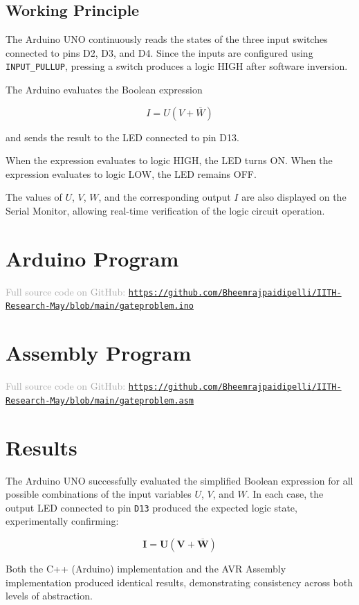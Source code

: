 \documentclass[12pt,a4paper]{article}
\begin{document}
\subsection{Working Principle}

The Arduino UNO continuously reads the states of the three input switches connected to pins D2, D3, and D4. Since the inputs are configured using \texttt{INPUT\_PULLUP}, pressing a switch produces a logic HIGH after software inversion.

The Arduino evaluates the Boolean expression

\[
I = U(V + \overline{W})
\]

and sends the result to the LED connected to pin D13.

When the expression evaluates to logic HIGH, the LED turns ON. When the expression evaluates to logic LOW, the LED remains OFF.

The values of $U$, $V$, $W$, and the corresponding output $I$ are also displayed on the Serial Monitor, allowing real-time verification of the logic circuit operation.

\section{{Arduino Program}}
\begin{center}
  \small\textcolor{DarkGray}{Full source code on GitHub:\enspace}
  \href{https://github.com/Bheemrajpaidipelli/IITH-Research-May/blob/main/gateproblem.ino}%
       {\textcolor{AccentTeal}{\texttt{https://github.com/Bheemrajpaidipelli/IITH-Research-May/blob/main/gateproblem.ino}}}
\end{center}
\section{Assembly Program}
\begin{center}
  \small\textcolor{DarkGray}{Full source code on GitHub:\enspace}
  \href{https://github.com/Bheemrajpaidipelli/IITH-Research-May/blob/main/gateproblem.asm}%
       {\textcolor{AccentTeal}{\texttt{https://github.com/Bheemrajpaidipelli/IITH-Research-May/blob/main/gateproblem.asm}}}
\end{center}
\section{Results}

\begin{tcolorbox}[resultbox, title={\faFlask\enspace Experimental Findings}]
The Arduino UNO successfully evaluated the simplified Boolean expression for
all possible combinations of the input variables $U$, $V$, and $W$. In each
case, the output LED connected to pin \texttt{D13} produced the expected logic
state, experimentally confirming:

\[
  \boldsymbol{I = U(V + \overline{W})}
\]

Both the C++ (Arduino) implementation and the AVR Assembly implementation
produced identical results, demonstrating consistency across both levels of
abstraction.
\end{tcolorbox}
\end{document}
